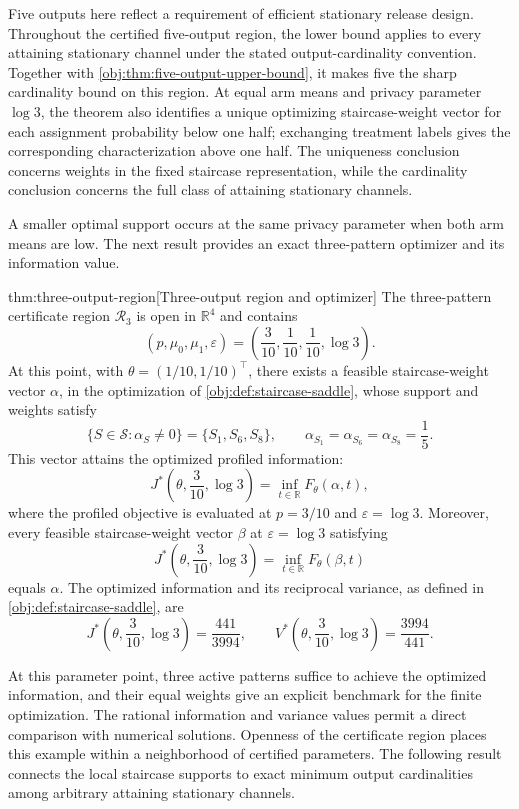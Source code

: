 \documentclass[11pt]{article}
\begin{document}
Five outputs here reflect a requirement of efficient stationary release design. Throughout the certified five-output region, the lower bound applies to every attaining stationary channel under the stated output-cardinality convention. Together with \cref{obj:thm:five-output-upper-bound}, it makes five the sharp cardinality bound on this region. At equal arm means and privacy parameter \(\log 3\), the theorem also identifies a unique optimizing staircase-weight vector for each assignment probability below one half; exchanging treatment labels gives the corresponding characterization above one half. The uniqueness conclusion concerns weights in the fixed staircase representation, while the cardinality conclusion concerns the full class of attaining stationary channels.

A smaller optimal support occurs at the same privacy parameter when both arm means are low. The next result provides an exact three-pattern optimizer and its information value.

\begin{theoremv}{thm:three-output-region}[Three-output region and optimizer]
The three-pattern certificate region \(\mathcal R_3\) is open in \(\mathbb R^4\) and contains
\[
(p,\mu_0,\mu_1,\varepsilon)
=\left(\frac{3}{10},\frac{1}{10},\frac{1}{10},\log 3\right).
\]
At this point, with \(\theta=(1/10,1/10)^\top\), there exists a feasible staircase-weight vector \(\alpha\), in the optimization of \cref{obj:def:staircase-saddle}, whose support and weights satisfy
\[
\{S\in\mathcal S:\alpha_S\ne0\}=\{S_1,S_6,S_8\},
\qquad
\alpha_{S_1}=\alpha_{S_6}=\alpha_{S_8}=\frac15.
\]
This vector attains the optimized profiled information:
\[
J^*\left(\theta,\frac{3}{10},\log 3\right)
=\inf_{t\in\mathbb R}F_\theta(\alpha,t),
\]
where the profiled objective is evaluated at \(p=3/10\) and \(\varepsilon=\log 3\). Moreover, every feasible staircase-weight vector \(\beta\) at \(\varepsilon=\log 3\) satisfying
\[
J^*\left(\theta,\frac{3}{10},\log 3\right)
=\inf_{t\in\mathbb R}F_\theta(\beta,t)
\]
equals \(\alpha\). The optimized information and its reciprocal variance, as defined in \cref{obj:def:staircase-saddle}, are
\[
J^*\left(\theta,\frac{3}{10},\log 3\right)=\frac{441}{3994},
\qquad
V^*\left(\theta,\frac{3}{10},\log 3\right)=\frac{3994}{441}.
\]
\end{theoremv}

At this parameter point, three active patterns suffice to achieve the optimized information, and their equal weights give an explicit benchmark for the finite optimization. The rational information and variance values permit a direct comparison with numerical solutions. Openness of the certificate region places this example within a neighborhood of certified parameters. The following result connects the local staircase supports to exact minimum output cardinalities among arbitrary attaining stationary channels.
\end{document}
